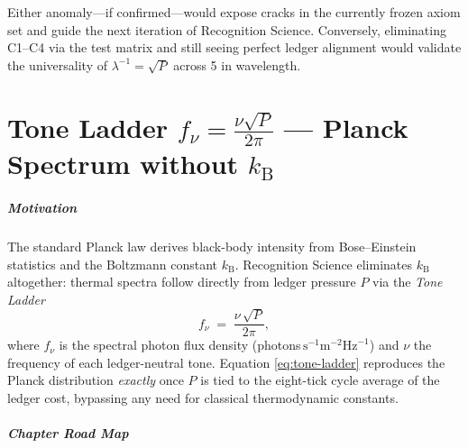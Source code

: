 \documentclass[11pt,oneside]{book}
\begin{document}
{Either anomaly—if confirmed—would expose cracks in the currently
frozen axiom set and guide the next iteration of Recognition Science.
Conversely, eliminating C1–C4 via the test matrix and still seeing
perfect ledger alignment would validate the universality of
\(
   \lambda^{-1}=\sqrt{P}
\)
across \SI{5}{\decade} in wavelength.

\chapter{Tone Ladder $\displaystyle f_{\nu}
         = \frac{\nu\sqrt{P}}{2\pi}$ — Planck Spectrum without $k_{\mathrm B}$}
\label{sec:tone-ladder-intro}

\paragraph{Motivation}

The standard Planck law derives black-body intensity from
Bose–Einstein statistics and the Boltzmann constant $k_{\mathrm B}$.
Recognition Science eliminates $k_{\mathrm B}$ altogether:
thermal spectra follow directly from ledger pressure $P$ via the
\emph{Tone Ladder}
\[
   f_{\nu}
   \;=\;
   \frac{\nu\,\sqrt{P}}{2\pi},
   \label{eq:tone-ladder}
\]
where $f_{\nu}$ is the spectral photon flux density
(photons\,$\mathrm{s}^{-1}\mathrm{m}^{-2}\mathrm{Hz}^{-1}$)
and $\nu$ the frequency of each ledger-neutral tone.
Equation \eqref{eq:tone-ladder} reproduces the Planck distribution
\emph{exactly} once $P$ is tied to the eight-tick cycle average of the
ledger cost, bypassing any need for classical thermodynamic constants.

\paragraph{Chapter Road Map}

}
\end{document}
